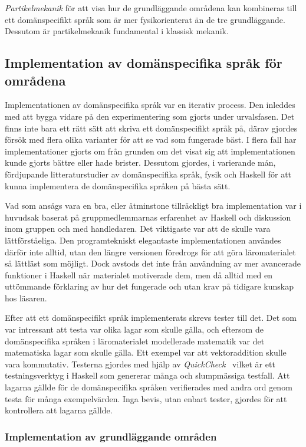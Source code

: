 \textit{Partikelmekanik} för att visa hur de grundläggande områdena kan kombineras till ett domänspecifikt språk som är mer fysikorienterat än de tre grundläggande. Dessutom är partikelmekanik fundamental i klassisk mekanik.

\subsection{Implementation av domänspecifika språk för områdena}

Implementationen av domänspecifika språk var en iterativ process. 
Den inleddes med att
bygga vidare på den experimentering som gjorts under urvalsfasen. Det finns inte bara
ett rätt sätt att skriva ett domänspecifikt språk på, därav gjordes försök med
flera olika varianter för att se vad som fungerade bäst.  I flera fall har implementationer gjorts om från grunden om
det visat sig att implementationen kunde gjorts bättre eller
hade brister. Dessutom gjordes, i varierande mån, fördjupande litteraturstudier av domänspecifika
språk, fysik och Haskell för att kunna implementera de domänspecifika språken på bästa sätt.

Vad som ansågs vara en bra, eller åtminstone tillräckligt bra implementation
var i huvudsak baserat på gruppmedlemmarnas erfarenhet av Haskell och diskussion
inom gruppen och med handledaren. Det viktigaste var att de skulle vara
lättförståeliga. Den programtekniskt elegantaste implementationen användes därför
inte alltid, utan den längre versionen föredrogs för att göra
läromaterialet så lättläst som möjligt. Dock avstods det inte från användning av
mer avancerade funktioner i Haskell när materialet motiverade dem, men då alltid med en uttömmande förklaring av hur det fungerade och
utan krav på tidigare kunskap hos läsaren.

Efter att ett domänspecifikt språk implementerats skrevs tester till det. Det
som var intressant att testa var olika lagar som skulle gälla, och  eftersom de
domänspecifika språken i läromaterialet modellerade matematik var det matematiska lagar
som skulle gälla. Ett exempel var att vektoraddition skulle vara kommutativ.
Testerna gjordes med hjälp av \textit{QuickCheck}~\cite{QC} vilket är ett
testningsverktyg i Haskell som genererar många och slumpmässiga testfall. Att
lagarna gällde för de domänspecifika språken verifierades med andra ord genom
testa för många exempelvärden. Inga bevis, utan enbart tester, gjordes för att kontrollera att lagarna gällde.

\subsubsection*{Implementation av grundläggande områden}
\label{sec:grund_impl}


